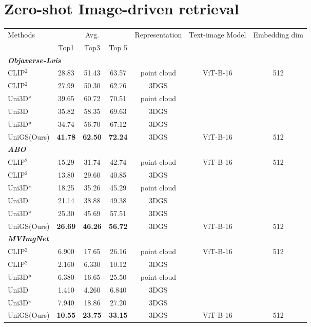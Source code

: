
\section{Zero-shot Image-driven retrieval}
\begin{table}[t]
		\centering
  \addtolength{\tabcolsep}{-0.5pt}
 \begin{tabularx}{\textwidth}{ l | c c c | c| c |c }
\toprule
\multirow{2}{*}{Methods}  & \multicolumn{3}{c|}{Avg.} & \multirow{2}{*}{Representation} & \multirow{2}{*}{Text-image Model} & \multirow{2}{*}{Embedding dim} \\
  & Top1 & Top3 & Top 5 & & \\
 \midrule  \midrule
    \multicolumn{3}{l}{\textit{\textbf{Objaverse-Lvis}}} \\
    \midrule
CLIP$^2$ & 28.83 & 51.43 & 63.57 & point cloud & \multirow{5}{*}{ViT-B-16} & \multirow{5}{*}{512}\\
CLIP$^2$ & 27.99 & 50.30 & 62.76 & 3DGS &  & \\
Uni3D* & 39.65 & 60.72 & 70.51 & point cloud &  & \\
Uni3D & 35.82 & 58.35 & 69.63 & 3DGS &  & \\
Uni3D* & 34.74 & 56.70 & 67.12 & 3DGS &  & \\
\midrule
\rowcolor{mygray}UniGS(Ours) & \textbf{41.78} & \textbf{62.50} & \textbf{72.24} & 3DGS & ViT-B-16 & 512\\

 \midrule  \midrule
    \multicolumn{3}{l}{\textit{\textbf{ABO}}} \\
\midrule
 CLIP$^2$ & 15.29 & 31.74 & 42.74 & point cloud & \multirow{5}{*}{ViT-B-16} & \multirow{5}{*}{512}\\
CLIP$^2$ & 13.80 & 29.60 & 40.85 & 3DGS &  & \\
 Uni3D* & 18.25 & 35.26 & 45.29 & point cloud &  & \\
Uni3D & 21.14 & 38.88 & 49.38 & 3DGS &  & \\
 Uni3D* & 25.30 & 45.69 & 57.51 & 3DGS & & \\
\midrule
\rowcolor{mygray} UniGS(Ours) & \textbf{26.69} & \textbf{46.26} & \textbf{56.72} & 3DGS & ViT-B-16 & 512\\

 \midrule  \midrule
    \multicolumn{3}{l}{\textit{\textbf{MVImgNet}}} \\
    \midrule
CLIP$^2$ & 6.900 & 17.65 & 26.16 & point cloud & \multirow{5}{*}{ViT-B-16} & \multirow{5}{*}{512}\\
 CLIP$^2$ & 2.160 & 6.330 & 10.12 & 3DGS &  & \\
 Uni3D* & 6.380 & 16.65 & 25.50 & point cloud &  & \\
 Uni3D & 1.410 & 4.260 & 6.840 & 3DGS &  & \\
Uni3D* & 7.940 & 18.86 & 27.20 & 3DGS &  & \\
\midrule
\rowcolor{mygray} UniGS(Ours) & \textbf{10.55} & \textbf{23.75} & \textbf{33.15} & 3DGS & ViT-B-16 & 512\\
\bottomrule
\end{tabularx}


\end{table}
